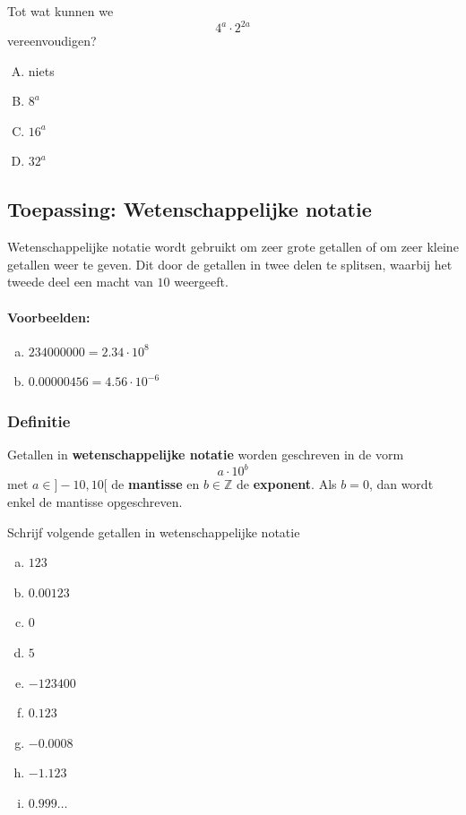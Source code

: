 \documentclass[12pt,twoside,a4paper]{article}
\begin{document}
\begin{oefening} %
  Tot wat kunnen we $$4^a \cdot 2^{2a}$$ vereenvoudigen?
  \begin{enumerate}[(A)]
  \item niets
  \item $8^a$
  \item $16^a$ %
  \item $32^a$
  \end{enumerate}
\end{oefening}

\subsection{Toepassing: Wetenschappelijke notatie}

Wetenschappelijke notatie wordt gebruikt om zeer grote getallen of om zeer kleine getallen weer te geven. Dit door de getallen in twee delen te splitsen, waarbij het tweede deel een macht van $10$ weergeeft.

\paragraph*{Voorbeelden:}
\begin{enumerate}[(a)]
\item $234000000 = 2.34 \cdot 10^8$
\item $0.00000456 = 4.56 \cdot 10^{-6}$
\end{enumerate}

\subsubsection*{Definitie}
\begin{mdframed}
Getallen in {\bf wetenschappelijke notatie} worden geschreven in de vorm
$$a \cdot 10^b$$
met $a\in]-10,10[$ de {\bf mantisse} en $b\in\mathbb{Z}$ de {\bf exponent}. Als $b=0$, dan wordt enkel de mantisse opgeschreven.
\end{mdframed}

\begin{oefening}
  Schrijf volgende getallen in wetenschappelijke notatie
  \begin{multicols}{3}
    \begin{enumerate}[(a)]
    \item $123$
    \item $0.00123$
    \item $0$
    \item $5$
    \item $-123400$
    \item $0.123$
    \item $-0.0008$
    \item $-1.123$
    \item $0.999\ldots$
    \end{enumerate}
  \end{multicols}
\end{oefening}
\end{document}
